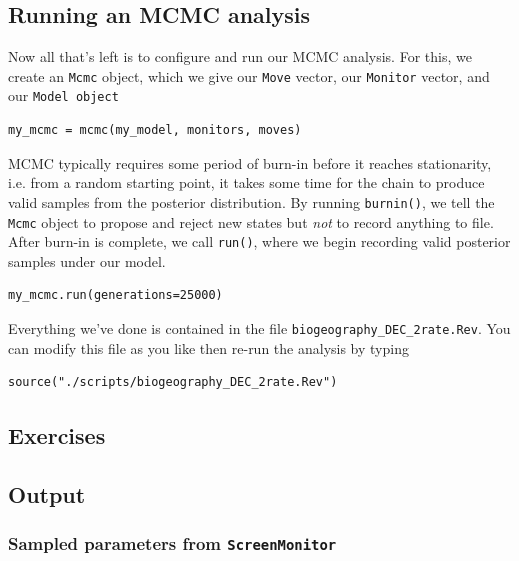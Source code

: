 \subsection{Running an MCMC analysis}

Now all that's left is to configure and run our MCMC analysis.
For this, we create an {\tt Mcmc} object, which we give our {\tt Move} vector, our {\tt Monitor} vector, and our {\tt Model object}

\begin{snugshade}
\begin{lstlisting}
my_mcmc = mcmc(my_model, monitors, moves)
\end{lstlisting}
\end{snugshade}

MCMC typically requires some period of burn-in before it reaches stationarity, i.e. from a random starting point, it takes some time for the chain to produce valid samples from the posterior distribution.
By running {\tt burnin()}, we tell the {\tt Mcmc} object to propose and reject new states but {\it not} to record anything to file.
After burn-in is complete, we call {\tt run()}, where we begin recording valid posterior samples under our model.

\begin{snugshade}
\begin{lstlisting}
my_mcmc.run(generations=25000)
\end{lstlisting}
\end{snugshade}

Everything we've done is contained in the file {\tt biogeography\_DEC\_2rate.Rev}.
You can modify this file as you like then re-run the analysis by typing

\begin{snugshade}
\begin{lstlisting}
source("./scripts/biogeography_DEC_2rate.Rev")
\end{lstlisting}
\end{snugshade}


\subsection{Exercises}



\subsection{Output}

\subsubsection{Sampled parameters from {\tt ScreenMonitor}}


